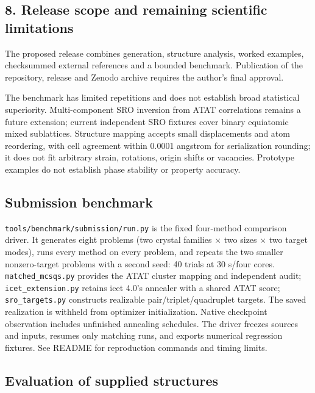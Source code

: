 \documentclass[
  11pt,
]{article}
\begin{document}
\subsection{8. Release scope and remaining scientific
limitations}\label{release-scope-and-remaining-scientific-limitations}

The proposed release combines generation, structure analysis, worked
examples, checksummed external references and a bounded benchmark.
Publication of the repository, release and Zenodo archive requires the
author's final approval.

The benchmark has limited repetitions and does not establish broad
statistical superiority. Multi-component SRO inversion from ATAT
correlations remains a future extension; current independent SRO
fixtures cover binary equiatomic mixed sublattices. Structure mapping
accepts small displacements and atom reordering, with cell agreement
within 0.0001 angstrom for serialization rounding; it does not fit
arbitrary strain, rotations, origin shifts or vacancies. Prototype
examples do not establish phase stability or property accuracy.

\subsection{Submission benchmark}\label{submission-benchmark}

\texttt{tools/benchmark/submission/run.py} is the fixed four-method
comparison driver. It generates eight problems (two crystal families ×
two sizes × two target modes), runs every method on every problem, and
repeats the two smaller nonzero-target problems with a second seed: 40
trials at 30 s/four cores. \texttt{matched\_mcsqs.py} provides the ATAT
cluster mapping and independent audit; \texttt{icet\_extension.py}
retains icet 4.0's annealer with a shared ATAT score;
\texttt{sro\_targets.py} constructs realizable pair/triplet/quadruplet
targets. The saved realization is withheld from optimizer
initialization. Native checkpoint observation includes unfinished
annealing schedules. The driver freezes sources and inputs, resumes only
matching runs, and exports numerical regression fixtures. See README for
reproduction commands and timing limits.

\subsection{Evaluation of supplied
structures}\label{evaluation-of-supplied-structures}
\end{document}
